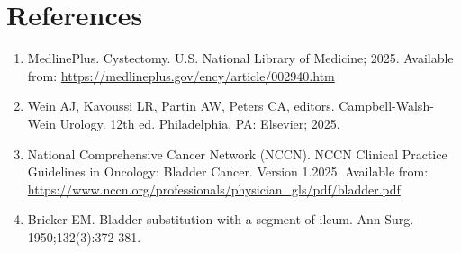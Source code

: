 \section*{References}
\begin{enumerate}
  \item MedlinePlus. Cystectomy. U.S. National Library of Medicine; 2025. Available from: \url{https://medlineplus.gov/ency/article/002940.htm}
  
  \item Wein AJ, Kavoussi LR, Partin AW, Peters CA, editors. Campbell-Walsh-Wein Urology. 12th ed. Philadelphia, PA: Elsevier; 2025.
  
  \item National Comprehensive Cancer Network (NCCN). NCCN Clinical Practice Guidelines in Oncology: Bladder Cancer. Version 1.2025. Available from: \url{https://www.nccn.org/professionals/physician_gls/pdf/bladder.pdf}
  
  \item Bricker EM. Bladder substitution with a segment of ileum. Ann Surg. 1950;132(3):372-381.
\end{enumerate}

\clearpage
